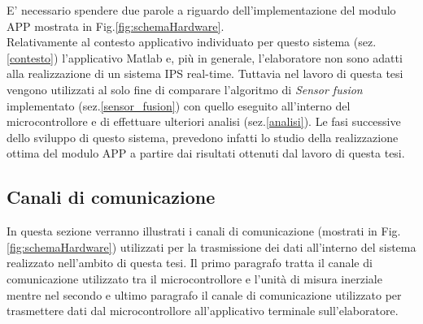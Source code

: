 E' necessario spendere due parole a riguardo dell'implementazione del modulo APP mostrata in Fig.\ref{fig:schemaHardware}. \\
Relativamente al contesto applicativo individuato per questo sistema (sez.\ref{contesto}) l'applicativo Matlab e, più in generale, l'elaboratore non sono adatti alla realizzazione di un sistema IPS real-time. Tuttavia nel lavoro di questa tesi vengono utilizzati al solo fine di comparare l'algoritmo di \textit{Sensor fusion} implementato (sez.\ref{sensor_fusion}) con quello eseguito all'interno del microcontrollore e di effettuare ulteriori analisi (sez.\ref{analisi}). Le fasi successive dello sviluppo di questo sistema, prevedono infatti lo studio della realizzazione ottima del modulo APP a partire dai risultati ottenuti dal lavoro di questa tesi.


\subsection{Canali di comunicazione}
In questa sezione verranno illustrati i canali di comunicazione (mostrati in Fig.\ref{fig:schemaHardware}) utilizzati per la trasmissione dei dati all'interno del sistema realizzato nell'ambito di questa tesi. Il primo paragrafo tratta il canale di comunicazione utilizzato tra il microcontrollore e l'unità di misura inerziale mentre nel secondo e ultimo paragrafo il canale di comunicazione utilizzato per trasmettere dati dal microcontrollore all'applicativo terminale sull'elaboratore.
